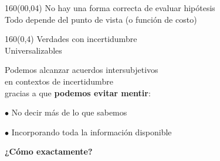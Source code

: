 \documentclass[shownotes,aspectratio=169]{beamer}
\begin{document}
\begin{frame}[plain]
\begin{textblock}{160}(00,04)
\centering
\LARGE No hay una forma correcta de evaluar hipótesis \\
\Large Todo depende del punto de vista (o función de costo)
\end{textblock}
\vspace{1cm} \large



\end{frame}

\begin{frame}[plain]
\begin{textblock}{160}(0,4) \centering
\LARGE Verdades con incertidumbre \\
\Large Universalizables
\end{textblock}
\vspace{2cm}

\Large \centering

Podemos alcanzar acuerdos intersubjetivos \\ en contextos de incertidumbre \\
gracias a que \textbf{podemos evitar mentir}:



\vspace{1cm} \pause \large

$\bullet$ No decir más de lo que sabemos

$\bullet$ Incorporando toda la información disponible

\pause \centering \vspace{1cm}

\textbf{¿Cómo exactamente?}


\end{frame}
\end{document}

